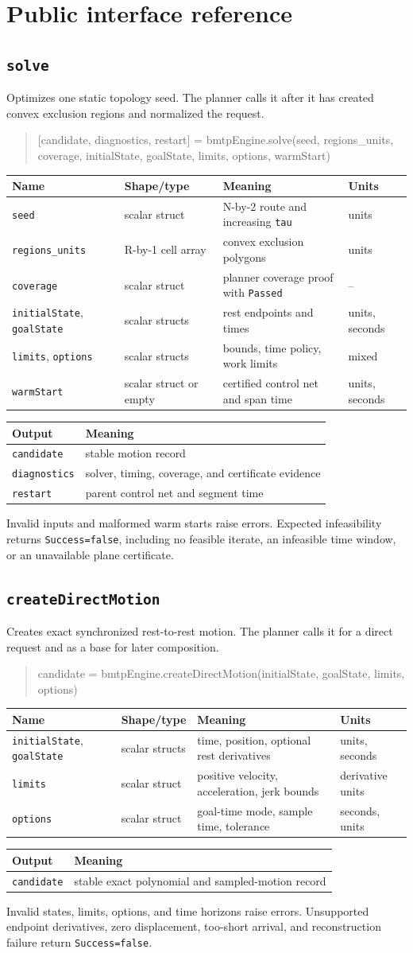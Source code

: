 \documentclass[11pt]{article}
\makeatletter
\newcommand{\iface}[5]{#1\par\begin{quote}\small\ttfamily\raggedright #2\par\end{quote}
\begin{tabularx}{\textwidth}{@{}p{.24\textwidth}p{.21\textwidth}Xp{.12\textwidth}@{}}\toprule Name & Shape/type & Meaning & Units \\\midrule #3\\\bottomrule\end{tabularx}
\begin{tabularx}{\textwidth}{@{}p{.30\textwidth}X@{}}\toprule Output & Meaning \\\midrule #4\\\bottomrule\end{tabularx}
\begingroup\sloppy #5\par\endgroup\medskip}
\makeatother
\begin{document}
\section{Public interface reference}
\subsection{\texttt{solve}}
\iface{Optimizes one static topology seed. The planner calls it after it has
created convex exclusion regions and normalized the request.}
{[candidate, diagnostics, restart] =\allowbreak{} bmtpEngine.solve(seed,\allowbreak{}
regions\_units,\allowbreak{} coverage,\allowbreak{} initialState,\allowbreak{}
goalState,\allowbreak{} limits,\allowbreak{} options,\allowbreak{} warmStart)}
{\texttt{seed} & scalar struct & N-by-2 route and increasing \texttt{tau} & units \\
\texttt{regions\_units} & R-by-1 cell array & convex exclusion polygons & units \\
\texttt{coverage} & scalar struct & planner coverage proof with \texttt{Passed} & -- \\
\texttt{initialState}, \texttt{goalState} & scalar structs & rest endpoints and times & units, seconds \\
\texttt{limits}, \texttt{options} & scalar structs & bounds, time policy, work limits & mixed \\
\texttt{warmStart} & scalar struct or empty & certified control net and span time & units, seconds}
{\texttt{candidate} & stable motion record \\
\texttt{diagnostics} & solver, timing, coverage, and certificate evidence \\
\texttt{restart} & parent control net and segment time}
{Invalid inputs and malformed warm starts raise errors. Expected infeasibility
returns \texttt{Success=false}, including no feasible iterate, an infeasible
time window, or an unavailable plane certificate.}

\subsection{\texttt{createDirectMotion}}
\iface{Creates exact synchronized rest-to-rest motion. The planner calls it for
a direct request and as a base for later composition.}
{candidate =\allowbreak{} bmtpEngine.createDirectMotion(initialState,\allowbreak{}
goalState,\allowbreak{} limits,\allowbreak{} options)}
{\texttt{initialState}, \texttt{goalState} & scalar structs & time, position, optional rest derivatives & units, seconds \\
\texttt{limits} & scalar struct & positive velocity, acceleration, jerk bounds & derivative units \\
\texttt{options} & scalar struct & goal-time mode, sample time, tolerance & seconds, units}
{\texttt{candidate} & stable exact polynomial and sampled-motion record}
{Invalid states, limits, options, and time horizons raise errors. Unsupported
endpoint derivatives, zero displacement, too-short arrival, and reconstruction
failure return \texttt{Success=false}.}
\end{document}
